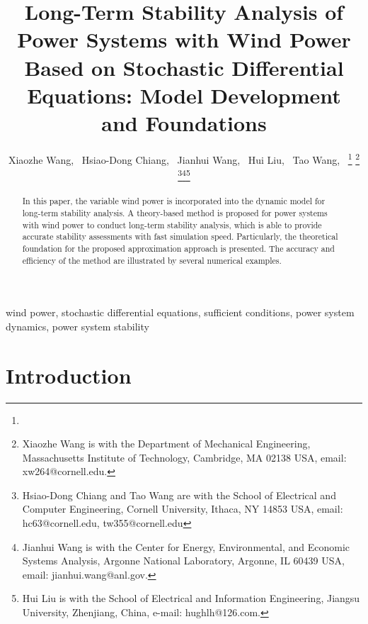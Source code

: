\documentclass[journal]{IEEEtran}
\begin{document}
\renewcommand{\thefigure}{\arabic{figure}}
\renewcommand{\thesubfigure}{\alph{subfigure}}

\title{Long-Term Stability Analysis of Power Systems with Wind Power Based on Stochastic Differential Equations: Model Development and Foundations}


\author{Xiaozhe Wang,~
        Hsiao-Dong Chiang,~
        Jianhui Wang,~
        Hui Liu,~
        Tao Wang,~
\thanks{}
\thanks{Xiaozhe Wang is with the Department of Mechanical Engineering, Massachusetts Institute of Technology, Cambridge,
MA 02138 USA, email: xw264@cornell.edu.}
\thanks{Hsiao-Dong Chiang and Tao Wang are with the School of Electrical and Computer Engineering, Cornell University, Ithaca,
NY 14853 USA, email: hc63@cornell.edu, tw355@cornell.edu}\thanks{Jianhui Wang is with the Center for Energy, Environmental, and Economic Systems Analysis, Argonne National Laboratory, Argonne, IL 60439 USA, email: jianhui.wang@anl.gov.}\thanks{Hui Liu is with the School of Electrical and Information Engineering, Jiangsu University, Zhenjiang, China, e-mail: hughlh@126.com.}
}


\maketitle


\begin{abstract}
In this paper, the variable wind power is incorporated into the dynamic model for long-term stability analysis. A theory-based method is proposed for power systems with wind power to conduct long-term stability analysis, which is able to provide accurate stability assessments with fast simulation speed. Particularly, the theoretical foundation for the proposed approximation approach is presented. The accuracy and efficiency of the method are illustrated by several numerical examples.
\end{abstract}

\begin{IEEEkeywords}
wind power, stochastic differential equations, sufficient conditions, power system dynamics, power system stability
\end{IEEEkeywords}

\IEEEpeerreviewmaketitle



\section{Introduction}
\end{document}

